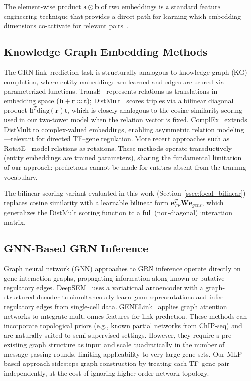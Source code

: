\documentclass[journal]{IEEEtran}
\begin{document}
The element-wise product $\mathbf{a} \odot \mathbf{b}$ of two embeddings is
a standard feature engineering technique that provides a direct path for
learning which embedding dimensions co-activate for relevant
pairs~\cite{rendle2010}.

\subsection{Knowledge Graph Embedding Methods}

The GRN link prediction task is structurally analogous to knowledge graph (KG)
completion, where entity embeddings are learned and edges are scored via
parameterized functions. TransE~\cite{bordes2013} represents relations as
translations in embedding space ($\mathbf{h} + \mathbf{r} \approx \mathbf{t}$);
DistMult~\cite{yang2015} scores triples via a bilinear diagonal product
$\mathbf{h}^T \text{diag}(\mathbf{r}) \mathbf{t}$, which is closely analogous
to the cosine-similarity scoring used in our two-tower model when the relation
vector is fixed. ComplEx~\cite{trouillon2016} extends DistMult to complex-valued
embeddings, enabling asymmetric relation modeling---relevant for directed
TF--gene regulation. More recent approaches such as RotatE~\cite{sun2019}
model relations as rotations. These methods operate transductively (entity
embeddings are trained parameters), sharing the fundamental limitation of our
approach: predictions cannot be made for entities absent from the training
vocabulary.

The bilinear scoring variant evaluated in this work
(Section~\ref{ssec:focal_bilinear}) replaces cosine similarity with a learnable
bilinear form $\mathbf{e}_{TF}^T \mathbf{W} \mathbf{e}_{gene}$, which
generalizes the DistMult scoring function to a full (non-diagonal) interaction
matrix.

\subsection{GNN-Based GRN Inference}

Graph neural network (GNN) approaches to GRN inference operate directly on
gene interaction graphs, propagating information along known or putative
regulatory edges. DeepSEM~\cite{shu2022} uses a variational autoencoder with
a graph-structured decoder to simultaneously learn gene representations and
infer regulatory edges from single-cell data. GENELink~\cite{chen2022genelink}
applies graph attention networks to integrate multi-omics features for link
prediction. These methods can incorporate topological priors (e.g., known
partial networks from ChIP-seq) and are naturally suited to semi-supervised
settings. However, they require a pre-existing graph structure as input
and scale quadratically in the number of message-passing rounds, limiting
applicability to very large gene sets. Our MLP-based approach sidesteps graph
construction by treating each TF--gene pair independently, at the cost of
ignoring higher-order network topology.
\end{document}
